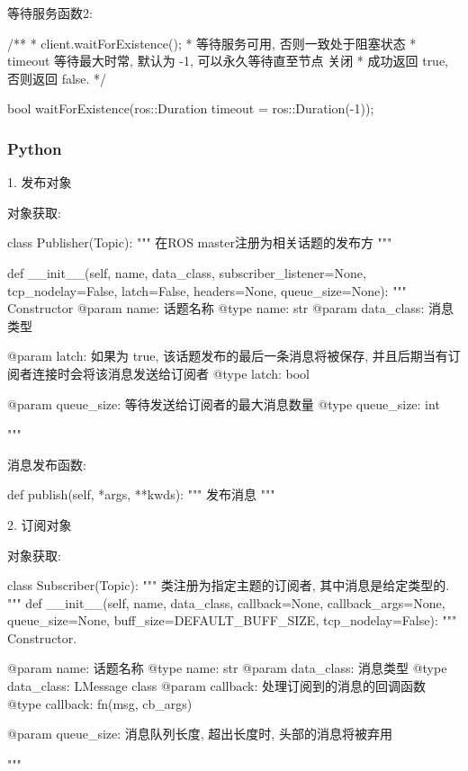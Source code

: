 \documentclass[openany, fontset=windowsold]{ctexbook}
\theoremstyle{kaiti}
\theoremstyle{normal}
\begin{document}
等待服务函数2:

\begin{cpp}
  /**
   * client.waitForExistence();
   * \brief 等待服务可用, 否则一致处于阻塞状态
   * \param timeout 等待最大时常, 默认为 -1, 可以永久等待直至节点 关闭
   * \return 成功返回 true, 否则返回 false.
   */

  bool waitForExistence(ros::Duration timeout = ros::Duration(-1));
\end{cpp}

\subsubsection{Python}

1. 发布对象

对象获取:

\begin{python}
  class Publisher(Topic):
      """
      在ROS master注册为相关话题的发布方
      """

      def __init__(self, name, data_class, subscriber_listener=None, tcp_nodelay=False, latch=False, headers=None, queue_size=None):
          """
          Constructor
          @param name: 话题名称 
          @type  name: str
          @param data_class: 消息类型

          @param latch: 如果为 true, 该话题发布的最后一条消息将被保存, 并且后期当有订阅者连接时会将该消息发送给订阅者
          @type  latch: bool

          @param queue_size: 等待发送给订阅者的最大消息数量
          @type  queue_size: int

          """
\end{python}

消息发布函数:

\begin{python}
  def publish(self, *args, **kwds):
          """
          发布消息
          """
\end{python}

2. 订阅对象

对象获取:

\begin{python}
  class Subscriber(Topic):
      """
    类注册为指定主题的订阅者, 其中消息是给定类型的.
      """
      def __init__(self, name, data_class, callback=None, callback_args=None,
                  queue_size=None, buff_size=DEFAULT_BUFF_SIZE, tcp_nodelay=False):
          """
          Constructor.

          @param name: 话题名称
          @type  name: str
          @param data_class: 消息类型
          @type  data_class: L{Message} class
          @param callback: 处理订阅到的消息的回调函数
          @type  callback: fn(msg, cb_args)

          @param queue_size: 消息队列长度, 超出长度时, 头部的消息将被弃用

          """
\end{python}
\end{document}

